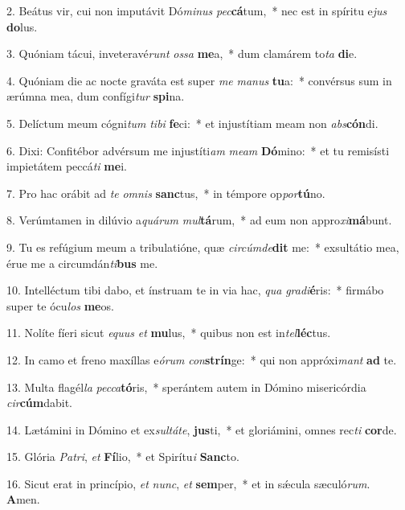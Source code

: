 2. Beátus vir, cui non imputávit Dó\textit{mi}\textit{nus} \textit{pec}\textbf{cá}tum,~*  nec est in spíritu e\textit{jus} \textbf{do}lus.\

3. Quóniam tácui, inveteravé\textit{runt} \textit{os}\textit{sa} \textbf{me}a,~*  dum clamárem to\textit{ta} \textbf{di}e.\

4. Quóniam die ac nocte graváta est super \textit{me} \textit{ma}\textit{nus} \textbf{tu}a:~*  convérsus sum in ærúmna mea, dum confígi\textit{tur} \textbf{spi}na.\

5. Delíctum meum cógni\textit{tum} \textit{ti}\textit{bi} \textbf{fe}ci:~*  et injustítiam meam non \textit{abs}\textbf{cón}di.\

6. Dixi: Confitébor advérsum me injustíti\textit{am} \textit{me}\textit{am} \textbf{Dó}mino:~*  et tu remisísti impietátem peccá\textit{ti} \textbf{me}i.\

7. Pro hac orábit ad \textit{te} \textit{om}\textit{nis} \textbf{sanc}tus,~*  in témpore op\textit{por}\textbf{tú}no.\

8. Verúmtamen in dilúvio a\textit{quá}\textit{rum} \textit{mul}\textbf{tá}rum,~*  ad eum non appro\textit{xi}\textbf{má}bunt.\

9. Tu es refúgium meum a tribulatióne, quæ \textit{cir}\textit{cúm}\textit{de}\textbf{dit} me:~*  exsultátio mea, érue me a circumdán\textit{ti}\textbf{bus} me.\

10. Intelléctum tibi dabo, et ínstruam te in via hac, \textit{qua} \textit{gra}\textit{di}\textbf{é}ris:~*  firmábo super te ócu\textit{los} \textbf{me}os.\

11. Nolíte fíeri sicut \textit{e}\textit{quus} \textit{et} \textbf{mu}lus,~*  quibus non est in\textit{tel}\textbf{léc}tus.\

12. In camo et freno maxíllas e\textit{ó}\textit{rum} \textit{con}\textbf{strín}ge:~*  qui non appróxi\textit{mant} \textbf{ad} te.\

13. Multa flagél\textit{la} \textit{pec}\textit{ca}\textbf{tó}ris,~*  sperántem autem in Dómino misericórdia \textit{cir}\textbf{cúm}dabit.\

14. Lætámini in Dómino et ex\textit{sul}\textit{tá}\textit{te}, \textbf{jus}ti,~*  et gloriámini, omnes rec\textit{ti} \textbf{cor}de.\

15. Glória \textit{Pa}\textit{tri}, \textit{et} \textbf{Fí}lio,~*  et Spirítu\textit{i} \textbf{Sanc}to.\

16. Sicut erat in princípio, \textit{et} \textit{nunc}, \textit{et} \textbf{sem}per,~*  et in sǽcula sæculó\textit{rum}. \textbf{A}men.\

